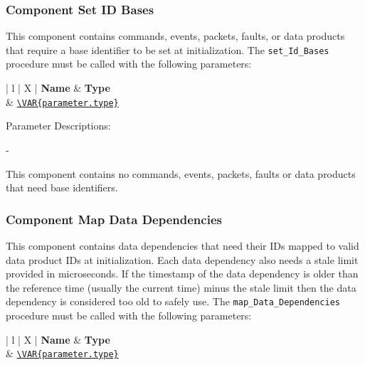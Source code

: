 \subsubsection{Component Set ID Bases}
This component contains commands, events, packets, faults, or data products that require a base identifier to be set at initialization. The \texttt{set\_Id\_Bases} procedure must be called with the following parameters:

\begin{xltabular}{\textwidth}{ | l | X | }
  \hline
  \textbf{Name} & \textbf{Type} \\ \hline
  \texttt{} & \texttt{\url{\VAR{parameter.type}}}  \\ \hline
\end{xltabular}
\vspace{5mm} %

Parameter Descriptions:
\begin{spaceditemize}
  \item \textbf{\texttt{}} - 
\end{spaceditemize}
\vspace{5mm} %
This component contains no commands, events, packets, faults or data products that need base identifiers.

\subsubsection{Component Map Data Dependencies}
This component contains data dependencies that need their IDs mapped to valid data product IDs at initialization. Each data dependency also needs a stale limit provided in microseconds. If the timestamp of the data dependency is older than the reference time (usually the current time) minus the stale limit then the data dependency is considered too old to safely use. The \texttt{map\_Data\_Dependencies} procedure must be called with the following parameters:

\begin{xltabular}{\textwidth}{ | l | X | }
  \hline
  \textbf{Name} & \textbf{Type} \\ \hline
  \texttt{} & \texttt{\url{\VAR{parameter.type}}}  \\ \hline
\end{xltabular}
\vspace{5mm} %

